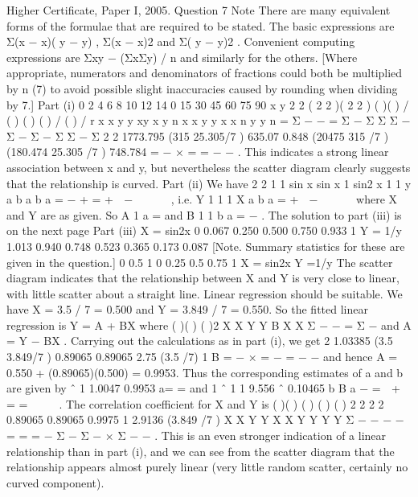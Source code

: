 Higher Certificate, Paper I, 2005. Question 7
Note There are many equivalent forms of the formulae that are required to be stated.
The basic expressions are Σ(x − x)( y − y) , Σ(x − x)2 and Σ( y − y)2 . Convenient
computing expressions are Σxy − (ΣxΣy) / n and similarly for the others. [Where
appropriate, numerators and denominators of fractions could both be multiplied by n
(7) to avoid possible slight inaccuracies caused by rounding when dividing by 7.]
Part (i)
0
2
4
6
8
10
12
14
0 15 30 45 60 75 90
x
y
2 2 ( 2 2 )( 2 2 )
( )( ) /
( ) ( ) ( ) / ( ) /
r x x y y xy x y n
x x y y x x n y y n
= Σ − − = Σ − Σ Σ
Σ − Σ − Σ − Σ Σ − Σ
2 2
1773.795 (315 25.305/7 ) 635.07 0.848
(20475 315 /7 )(180.474 25.305 /7 ) 748.784
= − × = =
− −
.
This indicates a strong linear association between x and y, but nevertheless the scatter
diagram clearly suggests that the relationship is curved.
Part (ii)
We have
2 2
1 1 sin x sin x 1 sin2 x 1 1
y a b a b a
= − + = +  −   
 
, i.e. Y 1 1 1 X
a b a
= +  −   
 
where
X and Y are as given.
So A 1
a
= and B 1 1
b a
= − .
The solution to part (iii) is on the next page
Part (iii)
X = sin2x 0 0.067 0.250 0.500 0.750 0.933 1
Y = 1/y 1.013 0.940 0.748 0.523 0.365 0.173 0.087
[Note. Summary statistics for these are given in the question.]
0
0.5
1
0 0.25 0.5 0.75 1
X = sin2x
Y
=1/y
The scatter diagram indicates that the relationship between X and Y is very close to
linear, with little scatter about a straight line. Linear regression should be suitable.
We have X = 3.5 / 7 = 0.500 and Y = 3.849 / 7 = 0.550.
So the fitted linear regression is Y = A + BX where ( )( )
( )2
X X Y Y
B
X X
Σ − −
=
Σ −
and
A = Y − BX .
Carrying out the calculations as in part (i), we get
2
1.03385 (3.5 3.849/7 ) 0.89065 0.89065
2.75 (3.5 /7) 1
B = − × = − = −
−
and hence A = 0.550 + (0.89065)(0.500) = 0.9953.
Thus the corresponding estimates of a and b are given by ˆ 1 1.0047
0.9953
a= = and
1 ˆ 1 1 9.556
ˆ 0.10465
b B
a
− =  +  = =  
 
.
The correlation coefficient for X and Y is
( )( )
( ) ( ) ( ) 2 2 2 2
0.89065 0.89065 0.9975
1 2.9136 (3.849 /7 )
X X Y Y
X X Y Y Y Y
Σ − − − − = = = −
Σ − Σ − × Σ − −
.
This is an even stronger indication of a linear relationship than in part (i), and we can
see from the scatter diagram that the relationship appears almost purely linear (very
little random scatter, certainly no curved component).

